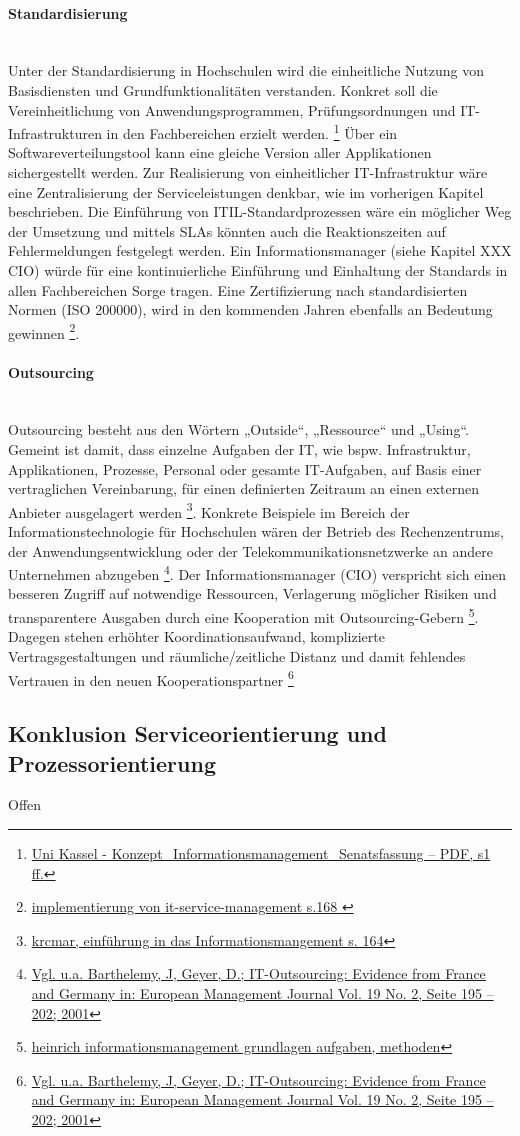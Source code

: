 \paragraph{Standardisierung}\mbox{}\\
Unter der Standardisierung in Hochschulen wird die einheitliche Nutzung von Basisdiensten und Grundfunktionalitäten verstanden. Konkret soll die Vereinheitlichung von Anwendungsprogrammen, Prüfungsordnungen und IT-Infrastrukturen in den Fachbereichen erzielt werden. \footnote{\url{Uni Kassel - Konzept_Informationsmanagement_Senatsfassung – PDF, s1 ff.}}
Über ein Softwareverteilungstool kann eine gleiche Version aller Applikationen sichergestellt werden. Zur Realisierung von einheitlicher IT-Infrastruktur wäre eine Zentralisierung der Serviceleistungen denkbar, wie im vorherigen Kapitel beschrieben. Die Einführung von ITIL-Standardprozessen wäre ein möglicher Weg der Umsetzung und mittels SLAs könnten auch die Reaktionszeiten auf Fehlermeldungen festgelegt werden. Ein Informationsmanager (siehe Kapitel XXX CIO) würde für eine kontinuierliche Einführung und Einhaltung der Standards in allen Fachbereichen Sorge tragen. Eine Zertifizierung nach standardisierten Normen (ISO 200000), wird in den kommenden Jahren ebenfalls an Bedeutung gewinnen \footnote{\url{implementierung von it-service-management s.168 }}.


\paragraph{Outsourcing}\mbox{}\\
Outsourcing besteht aus den Wörtern „Outside“, „Ressource“ und „Using“. Gemeint ist damit, dass einzelne Aufgaben der IT, wie bspw. Infrastruktur, Applikationen, Prozesse, Personal oder gesamte IT-Aufgaben, auf Basis einer vertraglichen Vereinbarung, für einen definierten Zeitraum an einen externen Anbieter ausgelagert werden \footnote{\url{krcmar, einführung in das Informationsmangement s. 164}}. Konkrete Beispiele im Bereich der Informationstechnologie für Hochschulen wären der Betrieb des Rechenzentrums, der Anwendungsentwicklung oder der Telekommunikationsnetzwerke an andere Unternehmen abzugeben \footnote{\url{Vgl. u.a. Barthelemy, J, Geyer, D.; IT-Outsourcing: Evidence from France and Germany in: European Management Journal Vol. 19 No. 2, Seite 195 – 202; 2001}}. Der Informationsmanager (CIO) verspricht sich einen besseren Zugriff auf notwendige Ressourcen, Verlagerung möglicher Risiken und transparentere Ausgaben durch eine Kooperation mit Outsourcing-Gebern \footnote{\url{heinrich informationsmanagement grundlagen aufgaben, methoden}}. Dagegen stehen erhöhter Koordinationsaufwand, komplizierte Vertragsgestaltungen und räumliche/zeitliche Distanz und damit fehlendes Vertrauen in den neuen Kooperationspartner \footnote{\url{Vgl. u.a. Barthelemy, J, Geyer, D.; IT-Outsourcing: Evidence from France and Germany in: European Management Journal Vol. 19 No. 2, Seite 195 – 202; 2001}}

\subsection{Konklusion Serviceorientierung und Prozessorientierung}
Offen